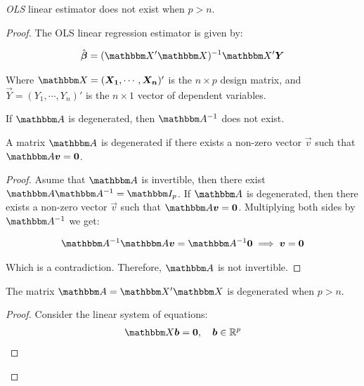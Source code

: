 \begin{claim*}
    \emph{OLS} linear estimator does not exist when $p > n$.

    \begin{proof}
        The OLS linear regression estimator is given by:

        \begin{align*}
            \hat{\Vec{\beta}} = (\Mat{X}'\Mat{X})^{-1}\Mat{X}'\Vec{Y}
        \end{align*}

        Where $\Mat{X} = (\Vec{X_1}, \cdots, \Vec{X_n})'$ is the $n \times p$ design matrix, and $\Vec{Y} = (Y_1, \cdots, Y_n)'$ is the $n \times 1$ vector of dependent variables. 

        \begin{lemma*}
            If $\Mat{A}$ is degenerated, then $\Mat{A}^{-1}$ does not exist.

            \begin{def*}
            A matrix $\Mat{A}$ is degenerated if there exists a non-zero vector $\Vec{v}$ such that $\Mat{A}\Vec{v} = \Vec{0}$.
            \end{def*}

            \begin{proof}
                Asume that $\Mat{A}$ is invertible, then there exist $\Mat{A}\Mat{A}^{-1} = \Mat{I}_p$. If $\Mat{A}$ is degenerated, then there exists a non-zero vector $\Vec{v}$ such that $\Mat{A}\Vec{v} = \Vec{0}$. Multiplying both sides by $\Mat{A}^{-1}$ we get:

                \begin{align*}
                    \Mat{A}^{-1}\Mat{A}\Vec{v} = \Mat{A}^{-1}\Vec{0} \implies \Vec{v} = \Vec{0}
                \end{align*}

                Which is a contradiction. Therefore, $\Mat{A}$ is not invertible.
            \end{proof}
        \end{lemma*}

        \begin{lemma*}
            The matrix $\Mat{A} = \Mat{X}'\Mat{X}$ is degenerated when $p > n$.

            \begin{proof}
                Consider the linear system of equations:
                \begin{align*}
                \Mat{X}\Vec{b} = \Vec{0}, \quad \Vec{b} \in \mathbb{R}^p
                \end{align*}


\end{proof}
\end{lemma*}
\end{proof}
\end{claim*}
